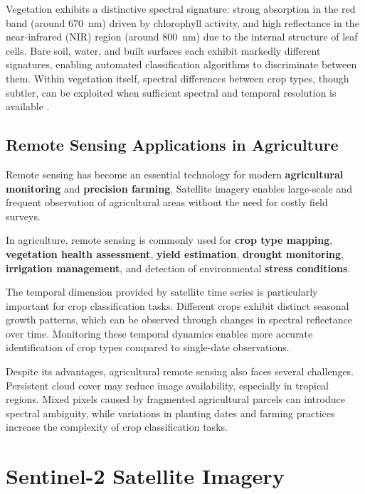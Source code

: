   Vegetation exhibits a distinctive spectral signature: strong 
  absorption in the red band (around 670~nm) driven by chlorophyll 
  activity, and high reflectance in the near-infrared (NIR) region 
  (around 800~nm) due to the internal structure of leaf cells. Bare 
  soil, water, and built surfaces each exhibit markedly different 
  signatures, enabling automated classification algorithms to 
  discriminate between them. Within vegetation itself, spectral 
  differences between crop types, though subtler, can be 
  exploited when sufficient spectral and temporal resolution is 
  available \cite{thenkabail2018}.

  \subsection{Remote Sensing Applications in Agriculture}
   
  Remote sensing has become an essential technology for modern \textbf{agricultural
  monitoring} and \textbf{precision farming}. Satellite imagery enables large-scale 
  and frequent observation of agricultural areas without the need for costly field surveys.

  In agriculture, remote sensing is commonly used for \textbf{crop type mapping}, 
  \textbf{vegetation health assessment}, \textbf{yield estimation}, \textbf{drought monitoring},
  \textbf{irrigation management}, and detection of environmental \textbf{stress conditions}. 
   
  The temporal dimension provided by satellite time series is particularly important 
  for crop classification tasks. Different crops exhibit distinct seasonal growth patterns,
  which can be observed through changes in spectral reflectance over time. Monitoring these 
  temporal dynamics enables more accurate identification of crop types compared to single-date observations.

  Despite its advantages, agricultural remote sensing also faces several challenges. Persistent cloud cover
  may reduce image availability, especially in tropical regions. Mixed pixels caused by 
  fragmented agricultural parcels can introduce spectral ambiguity, while variations in planting dates 
  and farming practices increase the complexity of crop classification tasks.

\section{Sentinel-2 Satellite Imagery}
  
